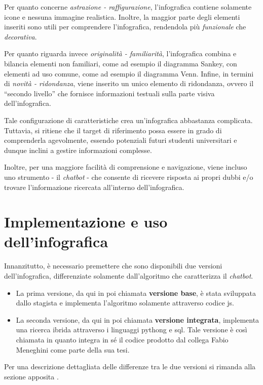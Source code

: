 Per quanto concerne \emph{astrazione - raffigurazione}, l'infografica contiene solamente icone e nessuna immagine realistica. Inoltre, la maggior parte degli elementi
inseriti sono utili per comprendere l'infografica, rendendola più \emph{funzionale} che \emph{decorativa}.

Per quanto riguarda invece \emph{originalità - familiarità}, l'infografica combina e bilancia elementi non familiari, come ad esempio il diagramma Sankey, con elementi
ad uso comune, come ad esempio il diagramma Venn. 
Infine, in termini di \emph{novità - ridondanza}, viene inserito un unico elemento di ridondanza, ovvero il ``secondo livello'' che fornisce informazioni testuali sulla parte visiva 
dell'infografica.

\bigskip
\noindent Tale configurazione di caratteristiche crea un'infografica abbastanza complicata. Tuttavia, si ritiene che il target di riferimento possa essere in grado di comprenderla agevolmente, essendo 
potenziali futuri studenti universitari e dunque inclini a gestire informazioni complesse. 

Inoltre, per una maggiore facilità di comprensione e navigazione, viene incluso uno strumento - il \emph{chatbot} - che consente di ricevere risposta ai propri dubbi e/o 
trovare l'informazione ricercata all'interno dell'infografica.

\section{Implementazione e uso dell'infografica}
Innanzitutto, è necessario premettere che sono disponibili due versioni dell'infografica, differenziate solamente dall'algoritmo che caratterizza il \emph{chatbot}.
\begin{itemize}
    \item La prima versione, da qui in poi chiamata \textbf{versione base}, è stata sviluppata dallo stagista e implementa l'algoritmo solamente attraverso codice \gls{js}. 
    \item La seconda versione, da qui in poi chiamata \textbf{versione integrata}, implementa una ricerca ibrida attraverso i linguaggi \gls{pythong} e \gls{sql}.
    Tale versione è così chiamata in quanto integra in sé il codice prodotto dal collega Fabio Meneghini come parte della sua tesi.    
\end{itemize}
Per una descrizione dettagliata delle differenze tra le due versioni si rimanda alla sezione apposita .

